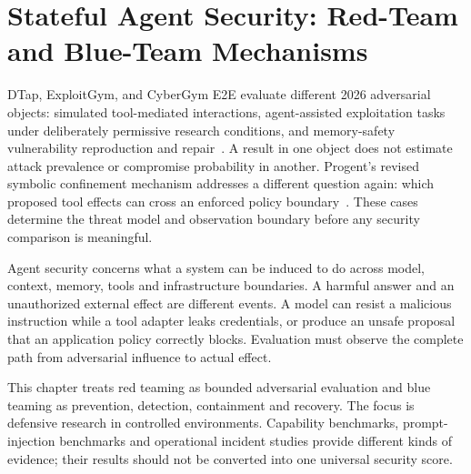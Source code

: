 \chapter{Stateful Agent Security: Red-Team and Blue-Team Mechanisms}\label{ch:C28}
DTap, ExploitGym, and CyberGym E2E evaluate different 2026 adversarial objects: simulated tool-mediated interactions, agent-assisted exploitation tasks under deliberately permissive research conditions, and memory-safety vulnerability reproduction and repair~\cite{corpus260504808,corpus260511086,corpus260604460}. A result in one object does not estimate attack prevalence or compromise probability in another. Progent's revised symbolic confinement mechanism addresses a different question again: which proposed tool effects can cross an enforced policy boundary~\cite{corpus250411703}. These cases determine the threat model and observation boundary before any security comparison is meaningful.

Agent security concerns what a system can be induced to do across model, context, memory, tools and infrastructure boundaries. A harmful answer and an unauthorized external effect are different events. A model can resist a malicious instruction while a tool adapter leaks credentials, or produce an unsafe proposal that an application policy correctly blocks. Evaluation must observe the complete path from adversarial influence to actual effect.

This chapter treats red teaming as bounded adversarial evaluation and blue teaming as prevention, detection, containment and recovery. The focus is defensive research in controlled environments. Capability benchmarks, prompt-injection benchmarks and operational incident studies provide different kinds of evidence; their results should not be converted into one universal security score.









